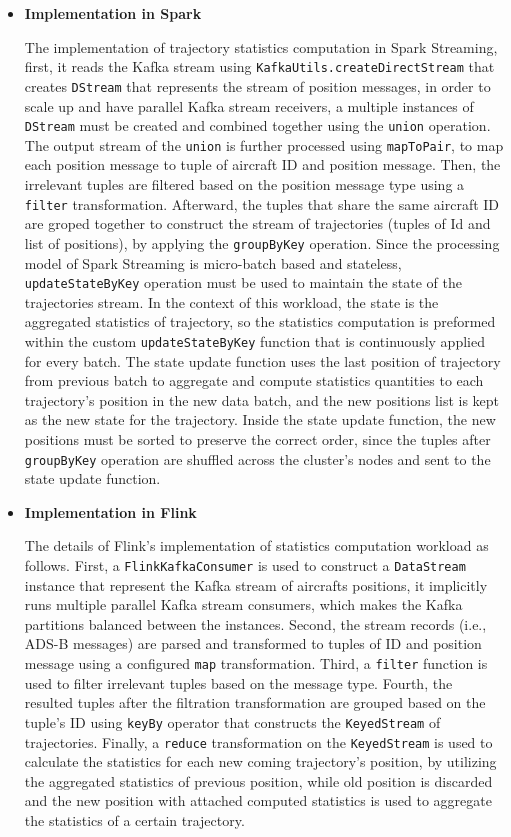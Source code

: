 \documentclass[]{article}
\begin{document}
\begin{itemize}
\item {\bf{Implementation in Spark }}

\par The implementation of trajectory statistics computation in Spark Streaming, first, it reads the Kafka stream using \texttt{KafkaUtils.createDirectStream} that creates \texttt{DStream} that represents the stream of position messages, in order to scale up and have parallel Kafka stream receivers, a multiple instances of \texttt{DStream} must be created and combined together using the \texttt{union} operation. The output stream of the \texttt{union} is further processed using \texttt{mapToPair}, to map each position message to tuple of aircraft ID and position message. Then, the irrelevant tuples are filtered based on the position message type using  a \texttt{filter} transformation. Afterward, the tuples that share the same aircraft ID are groped together to construct the stream of trajectories (tuples of Id and list of positions), by applying the \texttt{groupByKey} operation. Since the processing  model of Spark Streaming is micro-batch based and stateless, \texttt{updateStateByKey} operation must be used to maintain the state of the trajectories stream. In the context of this workload, the state is the aggregated statistics of trajectory, so the statistics computation is preformed within the custom \texttt{updateStateByKey} function that is continuously applied for every batch.
 The state update function uses the last position of trajectory from previous batch to aggregate and compute statistics quantities to each trajectory's position in the new data batch, and the new positions list is kept as the new state for the trajectory. Inside the state update function, the new positions must be sorted to preserve the correct order, since the tuples after \texttt{groupByKey} operation are shuffled across the cluster's  nodes and sent to the state update function.

\item {\bf{Implementation in Flink }}


The details of Flink's implementation of statistics computation workload as follows. First, a \texttt{FlinkKafkaConsumer} is used to  construct a \texttt{DataStream} instance that represent the Kafka stream of aircrafts positions, it implicitly runs multiple parallel Kafka stream consumers, which makes the Kafka partitions balanced between the instances. Second, the stream records (i.e., ADS-B messages) are parsed and transformed to tuples of ID and position message using a configured \texttt{map} transformation. Third, a \texttt{filter} function is used to filter irrelevant tuples based on the message type. Fourth, the resulted tuples after the filtration transformation are grouped based on the tuple's ID using \texttt{keyBy} operator that constructs the \texttt{KeyedStream} of trajectories. Finally, 
a \texttt{reduce} transformation on the  \texttt{KeyedStream} is used to calculate the statistics for each new coming trajectory's position, by utilizing the aggregated statistics of previous position, while old position is discarded and the new position with attached computed statistics is used to aggregate the statistics of a certain trajectory.


\end{itemize}
\end{document}
